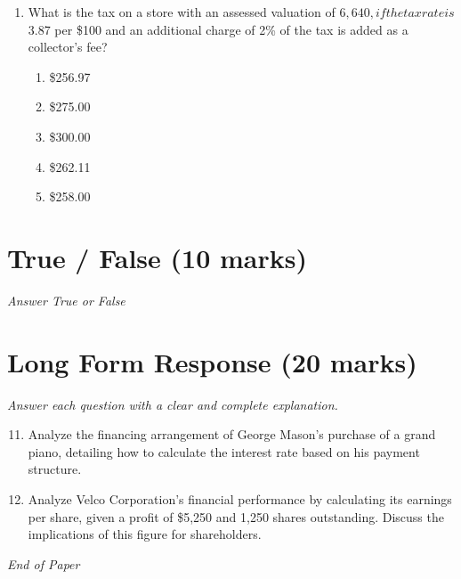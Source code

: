 \documentclass[12pt]{article}
\begin{document}
\begin{enumerate}[label=\arabic*.]
\begin{enumerate}[label=(\alph*)]
    \item \$190.20
    \item \$152.35
    \item \$198.75
    \item \$174.23
    \item \$210.00
\end{enumerate}
\item What is the tax on a store with an assessed valuation of $6,640, if the tax rate is $3.87 per \$100 and an additional charge of 2\% of the tax is added as a collector's fee?
\begin{enumerate}[label=(\alph*)]
    \item \$256.97
    \item \$275.00
    \item \$300.00
    \item \$262.11
    \item \$258.00
\end{enumerate}
\end{enumerate}

\section*{True / False (10 marks)}
\textit{Answer True or False}

\section*{Long Form Response (20 marks)}
\textit{Answer each question with a clear and complete explanation.}
\begin{enumerate}[label=\arabic*.]
\setcounter{enumi}{10}
\item Analyze the financing arrangement of George Mason's purchase of a grand piano, detailing how to calculate the interest rate based on his payment structure.
\item Analyze Velco Corporation's financial performance by calculating its earnings per share, given a profit of \$5,250 and 1,250 shares outstanding. Discuss the implications of this figure for shareholders.
\end{enumerate}

\vfill
\noindent\textit{End of Paper}
\end{document}
